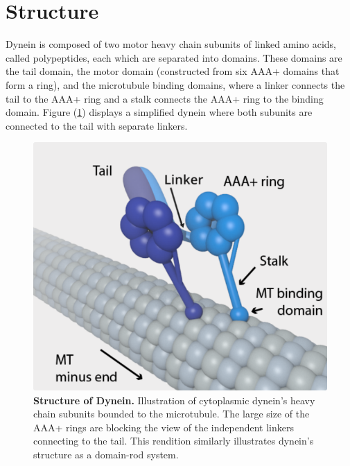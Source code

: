 \section{Structure}

Dynein is composed of two motor heavy chain subunits of linked amino acids, called polypeptides, each which are separated into domains. These domains are the tail domain, the motor domain (constructed from six AAA+ domains that form a ring), and the microtubule binding domains, where a linker connects the tail to the AAA+ ring and a stalk connects the AAA+ ring to the binding domain. Figure (\ref{fig:structure}) displays a simplified dynein where both subunits are connected to the tail with separate linkers. 


\begin{figure}[H]
	\centering
	\includegraphics[width=0.6\columnwidth]{Figures/dynein_on_MT.png}
	\caption[Structure of Dynein]{\textbf{Structure of Dynein.} Illustration of cytoplasmic dynein's heavy chain subunits bounded to the microtubule. The large size of the AAA+ rings are blocking the view of the independent linkers connecting to the tail. This rendition similarly illustrates dynein’s structure as a domain-rod system. \cite{TheTrappistArt}}
	\label{fig:structure}
\end{figure}

